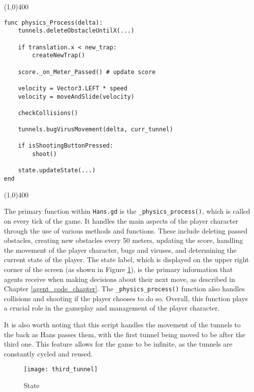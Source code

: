 \begin{center}
\line(1,0){400}
\begin{lstlisting}
func physics_Process(delta):
    tunnels.deleteObstacleUntilX(...)
    
    if translation.x < new_trap:
        createNewTrap()
        
    score._on_Meter_Passed() # update score
    
    velocity = Vector3.LEFT * speed
    velocity = moveAndSlide(velocity)
    
    checkCollisions()
    
    tunnels.bugVirusMovement(delta, curr_tunnel)
    
    if isShootingButtonPressed:
        shoot()
        
    state.updateState(...)
end
\end{lstlisting}
\line(1,0){400}
\end{center}

The primary function within \texttt{Hans.gd} is the \texttt{\_physics\_process()}, which is called on every tick of the game. It handles the main aspects of the player character through the use of various methods and functions. These include deleting passed obstacles, creating new obstacles every 50 meters, updating the score, handling the movement of the player character, bugs and viruses, and determining the current state of the player. The state label, which is displayed on the upper right corner of the screen (as shown in Figure \ref{fig:third_tunnel}), is the primary information that agents receive when making decisions about their next move, as described in Chapter \ref{agent_code_chapter}. The \texttt{\_physics\_process()} function also handles collisions and shooting if the player chooses to do so. Overall, this function plays a crucial role in the gameplay and management of the player character.

It is also worth noting that this script handles the movement of the tunnels to the back as Hans passes them, with the first tunnel being moved to be after the third one. This feature allows for the game to be infinite, as the tunnels are constantly cycled and reused.

\begin{figure}[h]
    \centering
    \texttt{[image: third\_tunnel]}
    \caption{State}
    \label{fig:third_tunnel}
\end{figure}

